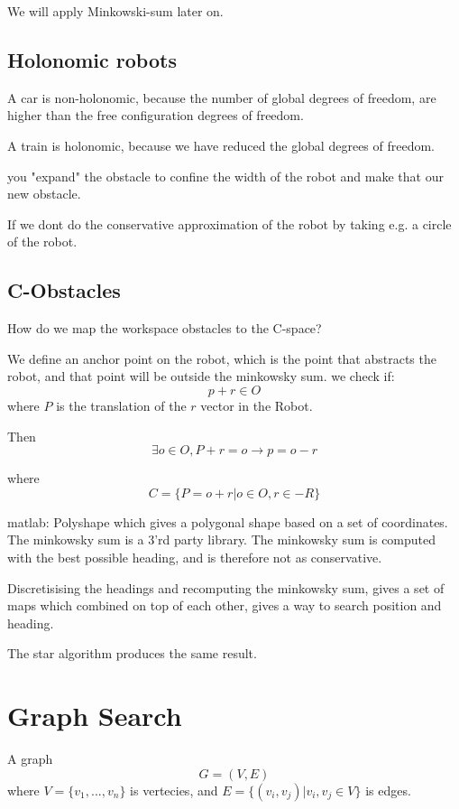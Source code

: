 \documentclass[a4paper]{article}
\begin{document}
We will apply Minkowski-sum later on.

\subsection{Holonomic robots}
A car is non-holonomic, because the number of global degrees of freedom, are higher than the free configuration degrees of freedom. 

A train is holonomic, because we have reduced the global degrees of freedom. 

you "expand" the obstacle to confine the width of the robot and make that our new obstacle. 

If we dont do the conservative approximation of the robot by taking e.g. a circle of the robot.

\subsection{C-Obstacles}
How do we map the workspace obstacles to the C-space?

We define an anchor point on the robot, which is the point that abstracts the robot, and that point will be outside the minkowsky sum.
we check if:
\begin{equation}
p + r \in O
\end{equation}
where $ P $ is the translation of the  $ r $ vector in the Robot.

Then 
\begin{equation}
\exists o \in O, P +r = o \rightarrow p = o-r
\end{equation}

where
\begin{equation}
	C = \{P = o + r | o \in O, r \in -R \}
\end{equation}

matlab: Polyshape which gives a polygonal shape based on a set of coordinates. The minkowsky sum is a 3'rd party library. The minkowsky sum is computed with the best possible heading, and is therefore not as conservative.

Discretisising the headings and recomputing the minkowsky sum, gives a set of maps which combined on top of each other, gives a way to search position and heading.

The star algorithm produces the same result.

\section{Graph Search}
A graph
\begin{equation}
G = (V,E)
\end{equation}
where $ V = \{v_1,...,v_n\} $ is vertecies, and  $ E = \{(v_i,v_j)| v_i, v_j \in V \} $ is edges.
\end{document}
